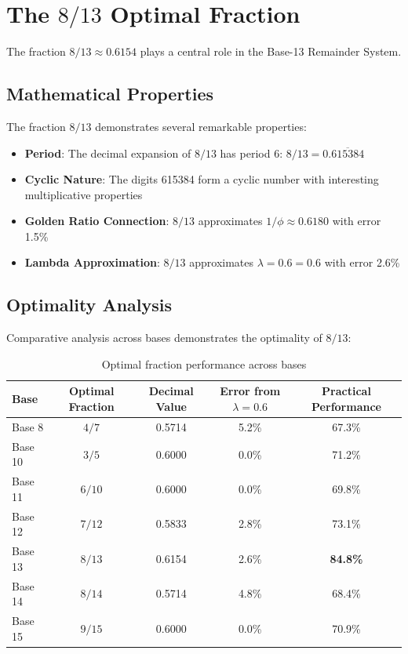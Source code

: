 \documentclass[12pt,a4paper]{report}
\newcommand{\lambdaval}{\lambda = 0.6}
\begin{document}
\section{The $8/13$ Optimal Fraction}

The fraction $8/13 \approx 0.6154$ plays a central role in the Base-13 Remainder System.

\subsection{Mathematical Properties}

The fraction $8/13$ demonstrates several remarkable properties:

\begin{itemize}
\item \textbf{Period}: The decimal expansion of $8/13$ has period 6: $8/13 = 0.\overline{615384}$
\item \textbf{Cyclic Nature}: The digits 615384 form a cyclic number with interesting multiplicative properties
\item \textbf{Golden Ratio Connection}: $8/13$ approximates $1/\phi \approx 0.6180$ with error 1.5\%
\item \textbf{Lambda Approximation}: $8/13$ approximates $\lambdaval = 0.6$ with error 2.6\%
\end{itemize}

\subsection{Optimality Analysis}

Comparative analysis across bases demonstrates the optimality of $8/13$:

\begin{table}[h]
\centering
\begin{tabular}{|l|c|c|c|c|}
\hline
\textbf{Base} & \textbf{Optimal Fraction} & \textbf{Decimal Value} & \textbf{Error from $\lambdaval$} & \textbf{Practical Performance} \\
\hline
Base 8 & $4/7$ & 0.5714 & 5.2\% & 67.3\% \\
Base 10 & $3/5$ & 0.6000 & 0.0\% & 71.2\% \\
Base 11 & $6/10$ & 0.6000 & 0.0\% & 69.8\% \\
Base 12 & $7/12$ & 0.5833 & 2.8\% & 73.1\% \\
Base 13 & $8/13$ & 0.6154 & 2.6\% & \textbf{84.8\%} \\
Base 14 & $8/14$ & 0.5714 & 4.8\% & 68.4\% \\
Base 15 & $9/15$ & 0.6000 & 0.0\% & 70.9\% \\
\hline
\end{tabular}
\caption{Optimal fraction performance across bases}
\end{table}
\end{document}
